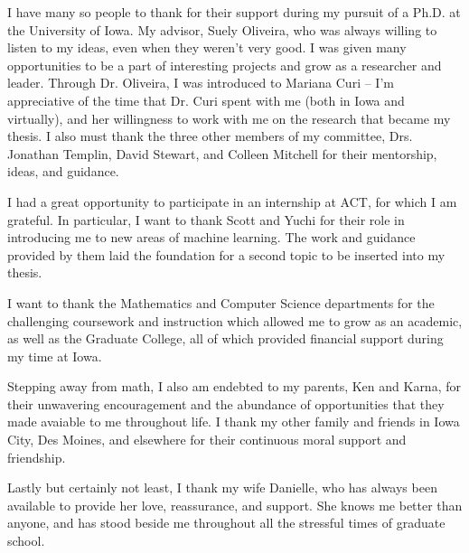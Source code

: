 I have many so people to thank for their support during my pursuit of a Ph.D. at the University of Iowa. My advisor, Suely Oliveira, who was always willing to listen to my ideas, even when they weren't very good. I was given many opportunities to be a part of interesting projects and grow as a researcher and leader. Through Dr. Oliveira, I was introduced to Mariana Curi -- I'm appreciative of the time that Dr. Curi spent with me (both in Iowa and virtually), and her willingness to work with me on the research that became my thesis. I also must thank the three other members of my committee, Drs. Jonathan Templin, David Stewart, and Colleen Mitchell for their mentorship, ideas, and guidance.

I had a great opportunity to participate in an internship at ACT, for which I am grateful. In particular, I want to thank Scott and Yuchi for their role in introducing me to new areas of machine learning. The work and guidance provided by them laid the foundation for a second topic to be inserted into my thesis.

I want to thank the Mathematics and Computer Science departments for the challenging coursework and instruction which allowed me to grow as an academic, as well as the Graduate College, all of which provided financial support during my time at Iowa.

Stepping away from math, I also am endebted to my parents, Ken and Karna, for their unwavering encouragement and the abundance of opportunities that they made avaiable to me throughout life. I thank my other family and friends in Iowa City, Des Moines, and elsewhere for their continuous moral support and friendship.

Lastly but certainly not least, I thank my wife Danielle, who has always been available to provide her love, reassurance, and support. She knows me better than anyone, and has stood beside me throughout all the stressful times of graduate school.
